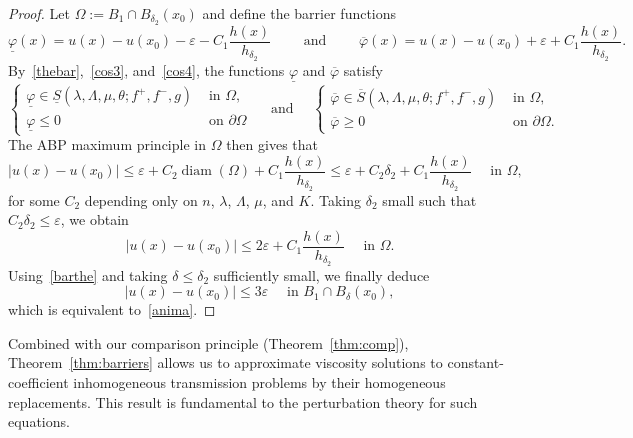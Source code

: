 \documentclass[letter,11pt]{amsart}
\newcommand{\vep}{\varepsilon}
\newcommand{\diam}[1]{\operatorname{diam}(#1)}
\theoremstyle{definition}
\numberwithin{equation}{section}
\begin{document}
\begin{proof}
Let $\Omega := B_1 \cap B_{\delta_2}(x_0)$ and define the barrier functions
\[
\underline{\varphi}(x) = u(x)- u(x_0) - \vep - C_1 \frac{h(x)}{h_{\delta_2}}
\qquad \text{ and } \qquad
\overline{\varphi}(x) = u(x)- u(x_0) + \vep + C_1 \frac{h(x)}{h_{\delta_2}}.
\]
By~\eqref{thebar},~\eqref{cos3}, and~\eqref{cos4}, the functions $\underline{\varphi}$ and $\overline{\varphi}$ satisfy
\[
\begin{cases}
\underline{\varphi} \in \underline{S}(\lambda, \Lambda, \mu, \theta; f^{+}, f^{-}, g) & \text{ in } \Omega,\\
\underline{\varphi} \leq 0 & \text{ on } \partial \Omega
\end{cases}
\quad \text{ and } \quad
\begin{cases}
\overline{\varphi} \in \overline{S}(\lambda, \Lambda, \mu, \theta; f^{+}, f^{-}, g) & \text{ in } \Omega,\\
\overline{\varphi} \geq 0 & \text{ on } \partial \Omega.
\end{cases}
\]
The ABP maximum principle in $\Omega$ then gives that
\[
|u(x) - u(x_0)| \leq \vep + C_2 \diam{\Omega} + C_1\frac{h(x)}{h_{\delta_2}} \leq \vep + C_2 \delta_2 + C_1\frac{h(x)}{h_{\delta_2}} \quad \text{ in } \Omega,
\]
for some $C_2$ depending only on $n$, $\lambda$, $\Lambda$, $\mu$, and $K$.
Taking $\delta_2$ small such that $C_2 \delta_2 \leq \vep$, we obtain
\[
|u(x) - u(x_0)| \leq 2 \vep + C_1\frac{h(x)}{h_{\delta_2}} \quad \text{ in } \Omega.
\]
Using~\eqref{barthe} and taking $\delta \leq \delta_2$ sufficiently small, we finally deduce
\[
|u(x) - u(x_0)| \leq 3 \vep \quad \text{ in } B_1 \cap B_{\delta}(x_0),
\]
which is equivalent to~\eqref{anima}.
\end{proof}

Combined with our comparison principle (Theorem~\ref{thm:comp}),
Theorem~\ref{thm:barriers} allows us to approximate viscosity solutions to constant-coefficient inhomogeneous transmission problems by their homogeneous replacements.
This result is fundamental to the perturbation theory for such equations.
\end{document}
